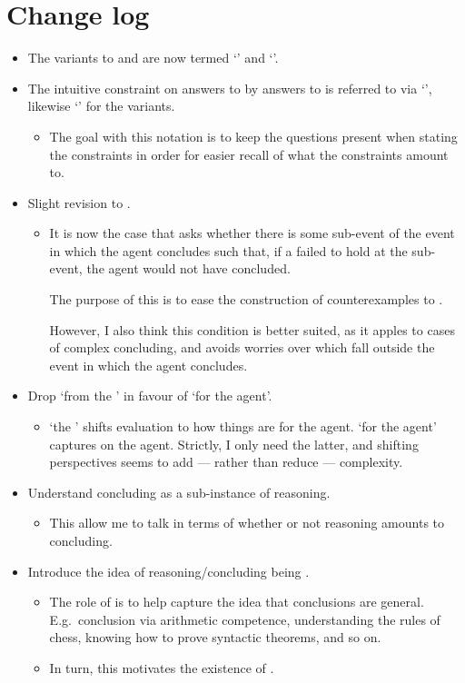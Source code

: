 \chapter*{Change log}
\label{cha:changes}


\begin{itemize}
\item
  The variants to \qWhy{} and \qHow{} are now termed `\qWhyV{}' and `\qHowV{}'.
\item
  The intuitive constraint on answers to \qWhy{} by answers to \qHow{} is referred to via `\issueInclusion{}', likewise `\issueConstraint{}' for the variants.
  \begin{itemize}
  \item
    The goal with this notation is to keep the questions present when stating the constraints in order for easier recall of what the constraints amount to.
  \end{itemize}
\item
  Slight revision to \qWhyV{}.
  \begin{itemize}
  \item
    It is now the case that \qWhyV{} asks whether there is some sub-event of the event in which the agent concludes such that, if a \ros{} failed to hold at the sub-event, the agent would not have concluded.

    The purpose of this is to ease the construction of counterexamples to \issueInclusion{}.

    However, I also think this condition is better suited, as it apples to cases of complex concluding, and avoids worries over  which fall outside the event in which the agent concludes.
  \end{itemize}
\item
  Drop `from the \agpe{}' in favour of `for the agent'.
  \begin{itemize}
  \item
    `the \agpe{}' shifts evaluation to how things are for the agent.
    `for the agent' captures  on the agent.
    Strictly, I only need the latter, and shifting perspectives seems to add --- rather than reduce --- complexity.
  \end{itemize}
\item
  Understand concluding as a sub-instance of reasoning.
  \begin{itemize}
  \item
    This allow me to talk in terms of whether or not reasoning amounts to concluding.
  \end{itemize}
\item
  Introduce the idea of reasoning/concluding being \sR{}.
  \begin{itemize}
  \item
    The role of \sR{} is to help capture the idea that conclusions are general.
    E.g.\ conclusion via arithmetic competence, understanding the rules of chess, knowing how to prove syntactic theorems, and so on.
  \item
    In turn, this motivates the existence of .
  \end{itemize}
\end{itemize}

